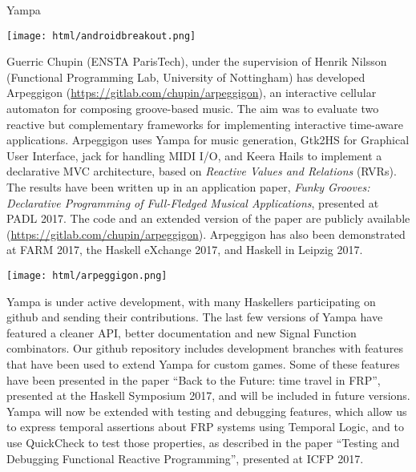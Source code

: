\begin{hcarentry}[updated]{Yampa}
\begin{center}
\texttt{[image: html/androidbreakout.png]}
\end{center}

Guerric Chupin (ENSTA ParisTech), under the supervision of Henrik Nilsson
(Functional Programming Lab, University of Nottingham) has developed Arpeggigon
(\href{https://gitlab.com/chupin/arpeggigon}{https://gitlab.com/chupin/arpeggigon}),
an interactive cellular automaton for composing groove-based music. The aim was
to evaluate two reactive but complementary frameworks for implementing
interactive time-aware applications. Arpeggigon uses Yampa for music
generation, Gtk2HS for Graphical User Interface, jack for handling MIDI I/O,
and Keera Hails to implement a declarative MVC architecture, based on
\emph{Reactive Values and Relations} (RVRs).  The results have been written up
in an application paper, \emph{Funky Grooves: Declarative Programming of
Full-Fledged Musical Applications}, presented at PADL 2017. The code and an
extended version of the paper are publicly available
(\href{https://gitlab.com/chupin/arpeggigon}{https://gitlab.com/chupin/arpeggigon}).
Arpeggigon has also been demonstrated at FARM 2017, the Haskell eXchange 2017,
and Haskell in Leipzig 2017. 

\begin{center}
  \texttt{[image: html/arpeggigon.png]}
\end{center}

Yampa is under active development, with many Haskellers  participating on
github and sending their contributions. The last few versions of Yampa have
featured a cleaner API, better documentation and new Signal Function
combinators. Our github repository includes development branches with features
that have been used to extend Yampa for custom games. Some of these features
have been presented in the paper ``Back to the Future: time travel in FRP'',
presented at the Haskell Symposium 2017, and will be included in future
versions. Yampa will now be extended with testing and debugging features, which
allow us to express temporal assertions about FRP systems using Temporal Logic,
and to use QuickCheck to test those properties, as described in the paper
``Testing and Debugging Functional Reactive Programming'', presented at ICFP
2017. 


\end{hcarentry}
